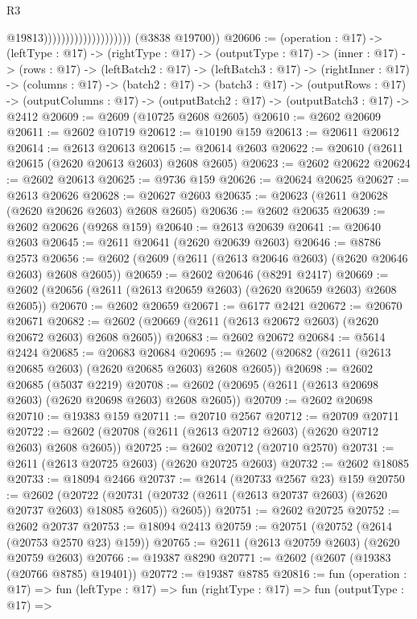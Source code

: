 \begin{lexlean}{R3}
\begin{coremodule}
                                              @19813))))))))))))))))))))
      (@3838 @19700))
@20606 := (operation : @17) ->
  (leftType : @17) ->
  (rightType : @17) ->
  (outputType : @17) ->
  (inner : @17) ->
  (rows : @17) ->
  (leftBatch2 : @17) ->
  (leftBatch3 : @17) ->
  (rightInner : @17) ->
  (columns : @17) ->
  (batch2 : @17) ->
  (batch3 : @17) ->
  (outputRows : @17) ->
  (outputColumns : @17) -> (outputBatch2 : @17) -> (outputBatch3 : @17) -> @2412
@20609 := @2609 (@10725 @2608 @2605)
@20610 := @2602 @20609
@20611 := @2602 @10719
@20612 := @10190 @159
@20613 := @20611 @20612
@20614 := @2613 @20613
@20615 := @20614 @2603
@20622 := @20610 (@2611 @20615 (@2620 @20613 @2603) @2608 @2605)
@20623 := @2602 @20622
@20624 := @2602 @20613
@20625 := @9736 @159
@20626 := @20624 @20625
@20627 := @2613 @20626
@20628 := @20627 @2603
@20635 := @20623 (@2611 @20628 (@2620 @20626 @2603) @2608 @2605)
@20636 := @2602 @20635
@20639 := @2602 @20626 (@9268 @159)
@20640 := @2613 @20639
@20641 := @20640 @2603
@20645 := @2611 @20641 (@2620 @20639 @2603)
@20646 := @8786 @2573
@20656 := @2602 (@2609 (@2611 (@2613 @20646 @2603) (@2620 @20646 @2603) @2608 @2605))
@20659 := @2602 @20646 (@8291 @2417)
@20669 := @2602 (@20656 (@2611 (@2613 @20659 @2603) (@2620 @20659 @2603) @2608 @2605))
@20670 := @2602 @20659
@20671 := @6177 @2421
@20672 := @20670 @20671
@20682 := @2602 (@20669 (@2611 (@2613 @20672 @2603) (@2620 @20672 @2603) @2608 @2605))
@20683 := @2602 @20672
@20684 := @5614 @2424
@20685 := @20683 @20684
@20695 := @2602 (@20682 (@2611 (@2613 @20685 @2603) (@2620 @20685 @2603) @2608 @2605))
@20698 := @2602 @20685 (@5037 @2219)
@20708 := @2602 (@20695 (@2611 (@2613 @20698 @2603) (@2620 @20698 @2603) @2608 @2605))
@20709 := @2602 @20698
@20710 := @19383 @159
@20711 := @20710 @2567
@20712 := @20709 @20711
@20722 := @2602 (@20708 (@2611 (@2613 @20712 @2603) (@2620 @20712 @2603) @2608 @2605))
@20725 := @2602 @20712 (@20710 @2570)
@20731 := @2611 (@2613 @20725 @2603) (@2620 @20725 @2603)
@20732 := @2602 @18085
@20733 := @18094 @2466
@20737 := @2614 (@20733 @2567 @23) @159
@20750 := @2602
    (@20722 (@20731 (@20732 (@2611 (@2613 @20737 @2603) (@2620 @20737 @2603) @18085 @2605)) @2605))
@20751 := @2602 @20725
@20752 := @2602 @20737
@20753 := @18094 @2413
@20759 := @20751 (@20752 (@2614 (@20753 @2570 @23) @159))
@20765 := @2611 (@2613 @20759 @2603) (@2620 @20759 @2603)
@20766 := @19387 @8290
@20771 := @2602 (@2607 (@19383 (@20766 @8785) @19401))
@20772 := @19387 @8785
@20816 := fun (operation : @17) =>
  fun (leftType : @17) =>
  fun (rightType : @17) =>
  fun (outputType : @17) =>

\end{coremodule}
\end{lexlean}
